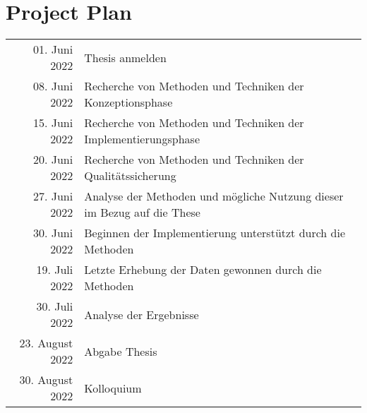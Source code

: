 \section*{Project Plan}

\begingroup
\def\arraystretch{2}
\setlength\tabcolsep{20pt}
\begin{tabular}{ rl }
01. Juni 2022 & Thesis anmelden \\
08. Juni 2022 & Recherche von Methoden und Techniken der Konzeptionsphase \\
15. Juni 2022 & Recherche von Methoden und Techniken der Implementierungsphase \\
20. Juni 2022 & Recherche von Methoden und Techniken der Qualitätssicherung \\ 
27. Juni 2022 & Analyse der Methoden und mögliche Nutzung dieser im Bezug auf die These \\
30. Juni 2022 & Beginnen der Implementierung unterstützt durch die Methoden \\
19. Juli 2022 & Letzte Erhebung der Daten gewonnen durch die Methoden \\
30. Juli 2022 & Analyse der Ergebnisse \\
23. August 2022 & Abgabe Thesis \\
30. August 2022 & Kolloquium \\
\end{tabular}
\endgroup
